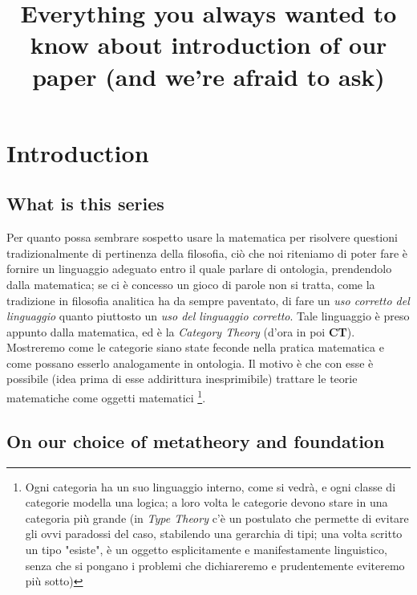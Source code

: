 \documentclass[a4paper, 11pt]{article}
\begin{document}
	\title{Everything you always wanted to know about introduction of our paper (and we're afraid to ask)}
	\maketitle
	
	\section{Introduction}
	\subsection{What is this series}
	Per quanto possa sembrare sospetto usare la matematica per risolvere questioni tradizionalmente di pertinenza della filosofia, ciò che noi riteniamo di poter fare è fornire un linguaggio adeguato entro il quale parlare di ontologia, prendendolo dalla matematica; se ci è concesso un gioco di parole non si tratta, come la tradizione in filosofia analitica ha da sempre paventato, di fare un \emph{uso corretto del linguaggio} quanto piuttosto un \emph{uso del linguaggio corretto}. Tale linguaggio è preso appunto dalla matematica, ed è la \emph{Category Theory} (d'ora in poi \textbf{CT}). Mostreremo come le categorie siano state feconde nella pratica matematica e come possano esserlo analogamente in ontologia. Il motivo è che con esse è possibile (idea prima di esse addirittura inesprimibile) trattare le teorie matematiche come oggetti matematici \footnote{Ogni categoria ha un suo linguaggio interno, come si vedrà, e ogni classe di categorie modella una logica; a loro volta le categorie devono stare in una categoria più grande (in \emph{Type Theory} c'è un postulato che permette di evitare gli ovvi paradossi del caso, stabilendo una gerarchia di tipi; una volta scritto un tipo "esiste", è un oggetto esplicitamente e manifestamente linguistico, senza che si pongano i problemi che dichiareremo e prudentemente eviteremo più sotto)}. 
	
	\subsection{On our choice of metatheory and foundation}
	
\end{document}
